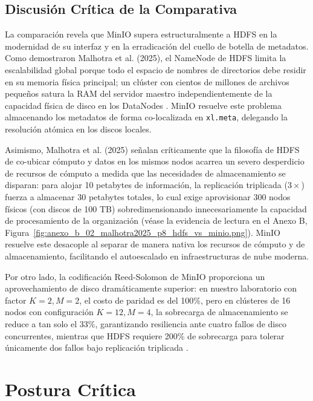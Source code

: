 \documentclass[12pt,a4paper]{article}
\begin{document}
\subsection{Discusión Crítica de la Comparativa}
La comparación revela que MinIO supera estructuralmente a HDFS en la modernidad de su interfaz y en la erradicación del cuello de botella de metadatos. Como demostraron Malhotra et al. (2025), el NameNode de HDFS limita la escalabilidad global porque todo el espacio de nombres de directorios debe residir en su memoria física principal; un clúster con cientos de millones de archivos pequeños satura la RAM del servidor maestro independientemente de la capacidad física de disco en los DataNodes \cite{malhotra2025evaluating}. MinIO resuelve este problema almacenando los metadatos de forma co-localizada en \texttt{xl.meta}, delegando la resolución atómica en los discos locales. 

Asimismo, Malhotra et al. (2025) señalan críticamente que la filosofía de HDFS de co-ubicar cómputo y datos en los mismos nodos acarrea un severo desperdicio de recursos de cómputo a medida que las necesidades de almacenamiento se disparan: para alojar 10 petabytes de información, la replicación triplicada ($3\times$) fuerza a almacenar 30 petabytes totales, lo cual exige aprovisionar 300 nodos físicos (con discos de 100 TB) sobredimensionando innecesariamente la capacidad de procesamiento de la organización \cite{malhotra2025evaluating} (véase la evidencia de lectura en el Anexo B, Figura~\ref{fig:anexo_b_02_malhotra2025_p8_hdfs_vs_minio.png}). MinIO resuelve este desacople al separar de manera nativa los recursos de cómputo y de almacenamiento, facilitando el autoescalado en infraestructuras de nube moderna.

Por otro lado, la codificación Reed-Solomon de MinIO proporciona un aprovechamiento de disco dramáticamente superior: en nuestro laboratorio con factor $K=2, M=2$, el costo de paridad es del 100\%, pero en clústeres de 16 nodos con configuración $K=12, M=4$, la sobrecarga de almacenamiento se reduce a tan solo el 33\%, garantizando resiliencia ante cuatro fallos de disco concurrentes, mientras que HDFS requiere 200\% de sobrecarga para tolerar únicamente dos fallos bajo replicación triplicada \cite{shin2023cache,makris2022edge}.

\section{Postura Crítica}
\end{document}
